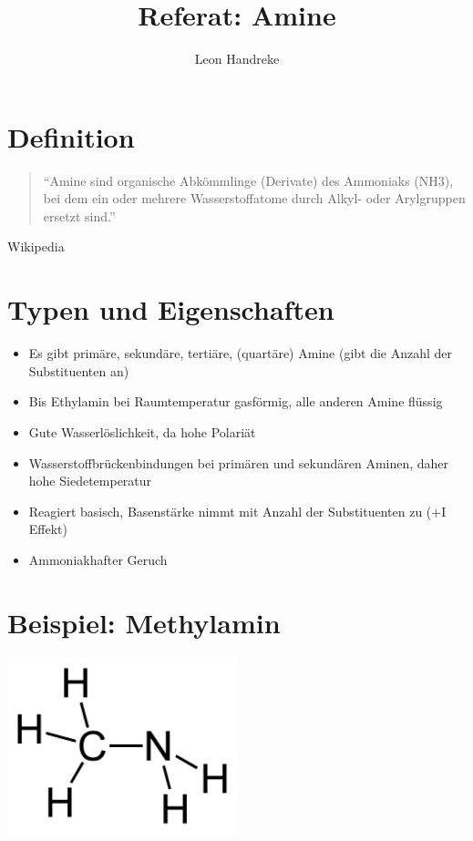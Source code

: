 \documentclass[11pt]{article}
\title{Referat: Amine}
\author{Leon Handreke}
\date{}                                           %
\begin{document}
\maketitle
{}\selectfont

\section{Definition}
\begin{quote}
  ``Amine sind organische Abkömmlinge (Derivate) des Ammoniaks (NH3), bei dem ein oder mehrere Wasserstoffatome durch Alkyl- oder Arylgruppen ersetzt sind.''
\end{quote}
\small{Wikipedia}

\section{Typen und Eigenschaften}
  \begin{itemize}
  \item Es gibt primäre, sekundäre, tertiäre, (quartäre) Amine (gibt die Anzahl der Substituenten an)
  \item Bis Ethylamin bei Raumtemperatur gasförmig, alle anderen Amine flüssig
  \item Gute Wasserlöslichkeit, da hohe Polariät
  \item Wasserstoffbrückenbindungen bei primären und sekundären Aminen, daher hohe Siedetemperatur
  \item Reagiert basisch, Basenstärke nimmt mit Anzahl der Substituenten zu (+I Effekt)
  \item Ammoniakhafter Geruch
  \end{itemize}

\section{Beispiel: Methylamin}
\begin{center}
  \includegraphics[width=0.5\textwidth]{methylamin.png}
\end{center}
\end{document}

